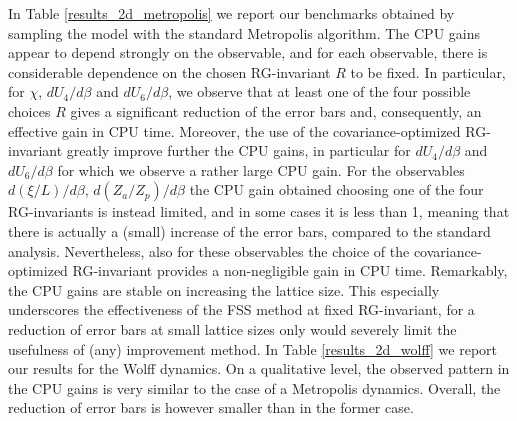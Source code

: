 \documentclass[pre,twocolumn]{revtex4-2}
\begin{document}
In Table \ref{results_2d_metropolis} we report our benchmarks obtained by sampling the model with the standard Metropolis algorithm.
The CPU gains appear to depend strongly on the observable, and for each observable, there is considerable dependence on the chosen RG-invariant $R$ to be fixed.
In particular, for $\chi$, $dU_4/d\beta$ and $dU_6/d\beta$, we observe that at least one of the four possible choices $R$ gives a significant reduction of the error bars and, consequently, an effective gain in CPU time.
Moreover,
the use of the covariance-optimized RG-invariant greatly improve further the CPU gains, in particular for $dU_4/d\beta$ and $dU_6/d\beta$ for which we observe a rather large CPU gain.
For the observables $d(\xi / L)/d\beta$, $d(Z_a / Z_p)/d\beta$ the CPU gain obtained choosing one of the four RG-invariants is instead limited, and in some cases it is less than 1, meaning that there is actually a (small) increase of the error bars, compared to the standard analysis.
Nevertheless, also for these observables the choice of the covariance-optimized RG-invariant provides a non-negligible gain in CPU time.
Remarkably, the CPU gains are stable on increasing the lattice size.
This especially underscores the effectiveness of the FSS method at fixed RG-invariant, for a reduction of error bars at small lattice sizes only would severely limit the usefulness of (any) improvement method.
In Table \ref{results_2d_wolff} we report our results for the Wolff dynamics.
On a qualitative level, the observed pattern in the CPU gains is very similar to the case of a Metropolis dynamics.
Overall, the reduction of error bars is however smaller than in the former case.
\end{document}
